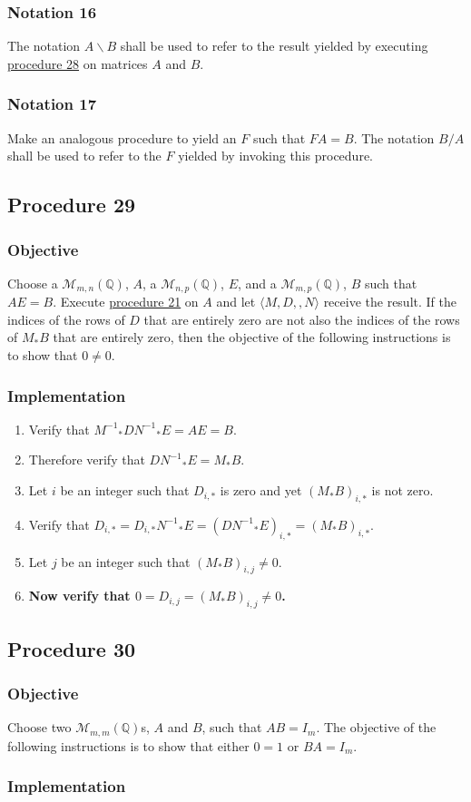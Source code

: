 \documentclass[twocolumn]{article}
\newcommand{\notation}[1]{\subsubsection*{Notation #1}}
\newcommand{\procedure}[2][]{\subsection*{Procedure #2 \ifthenelse{\equal{#1}{}}{}{(#1)}}\label{sec:procedure #2}}
\newcommand{\objective}{\subsubsection*{Objective}}
\newcommand{\implementation}{\subsubsection*{Implementation}}
\begin{document}
		\notation{16}
			The notation $A\backslash B$ shall be used to refer to the result yielded by executing \hyperref[sec:procedure 28]{procedure 28} on matrices $A$ and $B$.
		\notation{17}
			Make an analogous procedure to yield an $F$ such that $FA=B$. The notation $B/A$ shall be used to refer to the $F$ yielded by invoking this procedure.
		\procedure{29}
			\objective
				Choose a $\mathcal{M}_{m,n}(\mathbb{Q})$, $A$, a $\mathcal{M}_{n,p}(\mathbb{Q})$, $E$, and a $\mathcal{M}_{m,p}(\mathbb{Q})$, $B$ such that $AE=B$. Execute \hyperref[sec:procedure 21]{procedure 21} on $A$ and let $\langle M,D,,N\rangle$ receive the result. If the indices of the rows of $D$ that are entirely zero are not also the indices of the rows of $M_*B$ that are entirely zero, then the objective of the following instructions is to show that $0\ne 0$.
			\implementation
				\begin{enumerate}
					\item Verify that ${M^{-1}}_*D{N^{-1}}_*E=AE=B$.
					\item Therefore verify that $D{N^{-1}}_*E=M_*B$.
					\item Let $i$ be an integer such that $D_{i,*}$ is zero and yet $(M_*B)_{i,*}$ is not zero.
					\item Verify that $D_{i,*}=D_{i,*}{N^{-1}}_*E=(D{N^{-1}}_*E)_{i,*}=(M_*B)_{i,*}$.
					\item Let $j$ be an integer such that $(M_*B)_{i,j}\ne 0$.
					\item \textbf{Now verify that $0=D_{i,j}=(M_*B)_{i,j}\ne 0$.}
				\end{enumerate}
		\procedure{30}
			\objective
				Choose two $\mathcal{M}_{m,m}(\mathbb{Q})$s, $A$ and $B$, such that $AB=I_m$. The objective of the following instructions is to show that either $0=1$ or $BA=I_m$.
			\implementation
\end{document}
